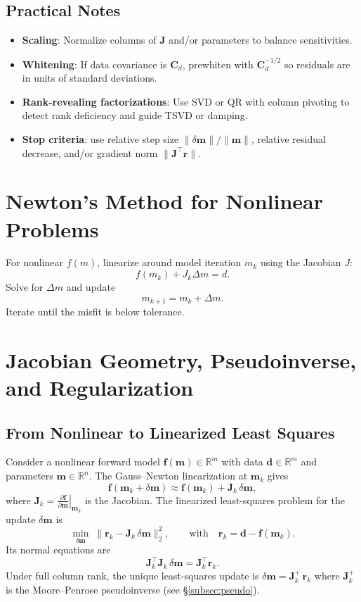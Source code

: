 \documentclass[11pt,a4paper]{article}
\begin{document}
\subsection{Practical Notes}
\begin{itemize}
  \item \textbf{Scaling}: Normalize columns of $\mathbf{J}$ and/or parameters to balance sensitivities.
  \item \textbf{Whitening}: If data covariance is $\mathbf{C}_d$, prewhiten with $\mathbf{C}_d^{-1/2}$ so residuals are in units of standard deviations.
  \item \textbf{Rank-revealing factorizations}: Use SVD or QR with column pivoting to detect rank deficiency and guide TSVD or damping.
  \item \textbf{Stop criteria}: use relative step size $\|\delta\mathbf{m}\|/\|\mathbf{m}\|$, relative residual decrease, and/or gradient norm $\|\mathbf{J}^\top \mathbf{r}\|$.
\end{itemize}

\section{Newton's Method for Nonlinear Problems}
For nonlinear $f(m)$, linearize around model iteration $m_k$ using the Jacobian $J$:
\begin{equation}
  f(m_k) + J_k \Delta m = d .
\end{equation}
Solve for $\Delta m$ and update
\begin{equation}
  m_{k+1} = m_k + \Delta m .
\end{equation}
Iterate until the misfit is below tolerance.

\section{Jacobian Geometry, Pseudoinverse, and Regularization}

\subsection{From Nonlinear to Linearized Least Squares}
Consider a nonlinear forward model $\mathbf{f}(\mathbf{m}) \in \mathbb{R}^m$ with data $\mathbf{d}\in\mathbb{R}^m$ and parameters $\mathbf{m}\in\mathbb{R}^n$. The Gauss--Newton linearization at $\mathbf{m}_k$ gives
\[
\mathbf{f}(\mathbf{m}_k+\delta\mathbf{m}) \approx \mathbf{f}(\mathbf{m}_k) + \mathbf{J}_k\,\delta\mathbf{m},
\]
where $\mathbf{J}_k = \left.\frac{\partial \mathbf{f}}{\partial \mathbf{m}}\right|_{\mathbf{m}_k}$ is the Jacobian. The linearized least-squares problem for the update $\delta\mathbf{m}$ is
\[
\min_{\delta\mathbf{m}} \; \|\mathbf{r}_k - \mathbf{J}_k \, \delta\mathbf{m}\|_2^2, \qquad \text{with} \quad \mathbf{r}_k = \mathbf{d} - \mathbf{f}(\mathbf{m}_k).
\]
Its normal equations are
\[
\mathbf{J}_k^\top \mathbf{J}_k \,\delta\mathbf{m} = \mathbf{J}_k^\top \mathbf{r}_k.
\]
Under full column rank, the unique least-squares update is $\delta\mathbf{m} = \mathbf{J}_k^{+}\,\mathbf{r}_k$ where $\mathbf{J}_k^{+}$ is the Moore--Penrose pseudoinverse (see \S\ref{subsec:pseudo}).
\end{document}
